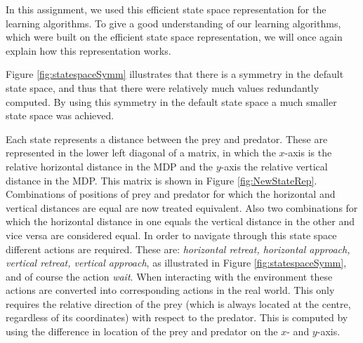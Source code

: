 \documentclass{article}
\begin{document}
In this assignment, we used this efficient state space representation for the learning algorithms. To give a good understanding of our learning algorithms, which were built on the efficient state space representation, we will once again explain how this representation works.

Figure \ref{fig:statespaceSymm} illustrates that there is a symmetry in the default state space, and thus that there were relatively much values redundantly computed.
By using this symmetry in the default state space a much smaller state space was achieved. 

Each state represents a distance between the prey and predator. These are represented in the lower left diagonal of a matrix, in which the $x$-axis is the relative horizontal distance in the MDP and the $y$-axis the relative vertical distance in the MDP. This matrix is shown in Figure \ref{fig:NewStateRep}. Combinations of positions of prey and predator for which the horizontal and vertical distances are equal are now treated equivalent. 
Also two combinations for which the horizontal distance in one equals the vertical distance in the other and vice versa are considered equal. In order to navigate through this state space different actions are required. These are: \textit{horizontal retreat, horizontal approach, vertical retreat, vertical approach}, as illustrated in Figure \ref{fig:statespaceSymm}, and of course the action \textit{wait}. When interacting with the environment these actions are converted into corresponding actions in the real world. This only requires the relative direction of the prey (which is always located at the centre, regardless of its coordinates) with respect to the predator. This is computed by using the difference in location of the prey and predator on the $x$- and $y$-axis.
\end{document}
